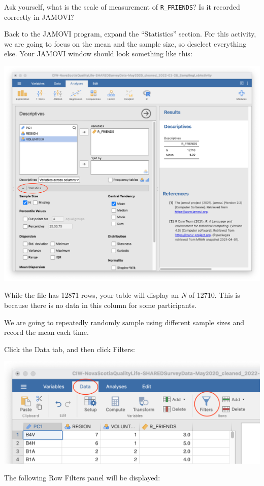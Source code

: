 \documentclass[
]{book}
\begin{document}
Ask yourself, what is the scale of measurement of \texttt{R\_FRIENDS}? Is it recorded correctly in JAMOVI?

Back to the JAMOVI program, expand the ``Statistics'' section. For this activity, we are going to focus on the mean and the sample size, so deselect everything else. Your JAMOVI window should look something like this:

\includegraphics{img/AnalysisSetup.png}

While the file has 12871 rows, your table will display an \emph{N} of 12710. This is because there is no data in this column for some participants.

We are going to repeatedly randomly sample using different sample sizes and record the mean each time.

Click the {Data} tab, and then click {Filters}:

\includegraphics{img/Filters.png}

The following Row Filters panel will be displayed:
\end{document}

